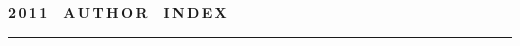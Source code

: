 \def\stat{cont-e}
{%
\raggedleft\Large \bf%
2\,0\,1\,1\ \ A\,U\,T\,H\,O\,R\ \ I\,N\,D\,E\,X \vskip 17pt
    \hrule
    \par
{} }

\label{st\stat}

\def\tit{\ }

\def\aut{\ }
\def\auf{\ }

\def\leftkol{\ } %

\def\rightkol{\ } %

\titele{\tit}{\aut}{\auf}{\leftkol}{\rightkol}

\vspace*{-12pt}

